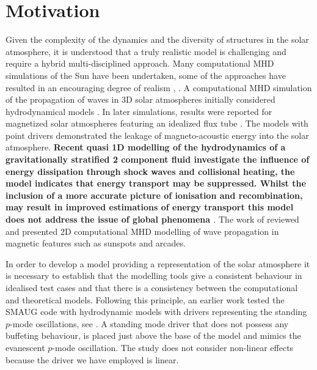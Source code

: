 \documentclass[physics,article,submit,pdftex,moreauthors]{Definitions/mdpi}
\begin{document}
\section{Motivation}
\label{sec:motivation}

Given the complexity of the dynamics and the diversity of structures in the solar atmosphere, it is understood that a truly realistic model is challenging and  require a hybrid multi-disciplined approach. Many computational MHD simulations of the Sun have been undertaken, some of the approaches have resulted in an encouraging degree of realism  \cite{Vogler2005}, \cite{Gudiksen2011}. A computational MHD simulation of the propagation of waves in 3D solar atmospheres initially considered hydrodynamical models \cite{Fedun2009a}.  In later simulations, 
 results were reported for magnetized solar atmospheres featuring an idealized flux tube \cite{Fedun2009b} \cite{Vigeesh2012}. The models with point drivers demonstrated the leakage of magneto-acoustic energy into the solar atmosphere. {\bf Recent quasi 1D modelling of the hydrodynamics of a gravitationally stratified 2 component fluid investigate the influence of energy dissipation through shock waves and collisional heating, the model indicates that energy transport may be suppressed. Whilst the inclusion of a more accurate picture of ionisation and recombination, may result in improved estimations of energy transport this model does not address the issue of global phenomena \cite{Zhang2021}}.   The work of \cite{Khomenko2013} \cite{Santamaria2015} reviewed and presented 2D computational MHD modelling of wave propagation in magnetic features such as sunspots and arcades. 

In order to develop a model providing a representation of the solar atmosphere it is necessary to establish that the modelling tools give a consistent behaviour in idealised test cases and that there is a consistency between the computational and theoretical models.  Following this principle, an earlier work tested the SMAUG code with hydrodynamic models with drivers representing the standing $p$-mode oscillations, see \cite{Griffiths2018b}. A standing mode driver that does not possess any buffeting behaviour, is placed just above the base of the model and mimics the evanescent $p$-mode oscillation. The study does not consider non-linear effects because the driver we have employed is linear.


\end{document}
